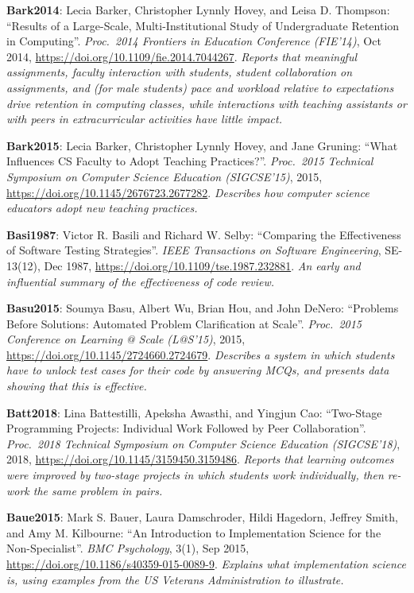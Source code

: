 \textbf{\hypertarget{b:Bark2014}{Bark2014}\label{b:Bark2014}}: Lecia Barker, Christopher Lynnly Hovey, and Leisa D. Thompson: ``Results of a Large-Scale, Multi-Institutional Study of Undergraduate Retention in Computing''. \emph{Proc.\ 2014 Frontiers in Education Conference (FIE'14)}, Oct 2014, \url{https://doi.org/10.1109/fie.2014.7044267}. \emph{Reports that meaningful assignments, faculty interaction with students, student collaboration on assignments, and (for male students) pace and workload relative to expectations drive retention in computing classes, while interactions with teaching assistants or with peers in extracurricular activities have little impact.}

\textbf{\hypertarget{b:Bark2015}{Bark2015}\label{b:Bark2015}}: Lecia Barker, Christopher Lynnly Hovey, and Jane Gruning: ``What Influences CS Faculty to Adopt Teaching Practices?''. \emph{Proc.\ 2015 Technical Symposium on Computer Science Education (SIGCSE'15)}, 2015, \url{https://doi.org/10.1145/2676723.2677282}. \emph{Describes how computer science educators adopt new teaching practices.}

\textbf{\hypertarget{b:Basi1987}{Basi1987}\label{b:Basi1987}}: Victor R. Basili and Richard W. Selby: ``Comparing the Effectiveness of Software Testing Strategies''. \emph{IEEE Transactions on Software Engineering}, SE-13(12), Dec 1987, \url{https://doi.org/10.1109/tse.1987.232881}. \emph{An early and influential summary of the effectiveness of code review.}

\textbf{\hypertarget{b:Basu2015}{Basu2015}\label{b:Basu2015}}: Soumya Basu, Albert Wu, Brian Hou, and John DeNero: ``Problems Before Solutions: Automated Problem Clarification at Scale''. \emph{Proc.\ 2015 Conference on Learning @ Scale (L@S'15)}, 2015, \url{https://doi.org/10.1145/2724660.2724679}. \emph{Describes a system in which students have to unlock test cases for their code by answering MCQs, and presents data showing that this is effective.}

\textbf{\hypertarget{b:Batt2018}{Batt2018}\label{b:Batt2018}}: Lina Battestilli, Apeksha Awasthi, and Yingjun Cao: ``Two-Stage Programming Projects: Individual Work Followed by Peer Collaboration''. \emph{Proc.\ 2018 Technical Symposium on Computer Science Education (SIGCSE'18)}, 2018, \url{https://doi.org/10.1145/3159450.3159486}. \emph{Reports that learning outcomes were improved by two-stage projects in which students work individually, then re-work the same problem in pairs.}

\textbf{\hypertarget{b:Baue2015}{Baue2015}\label{b:Baue2015}}: Mark S. Bauer, Laura Damschroder, Hildi Hagedorn, Jeffrey Smith, and Amy M. Kilbourne: ``An Introduction to Implementation Science for the Non-Specialist''. \emph{BMC Psychology}, 3(1), Sep 2015, \url{https://doi.org/10.1186/s40359-015-0089-9}. \emph{Explains what implementation science is, using examples from the US Veterans Administration to illustrate.}

